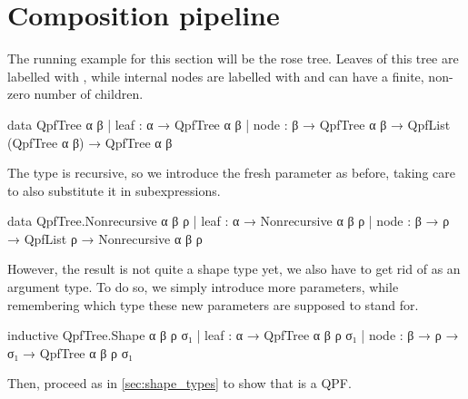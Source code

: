 \section{Composition pipeline}%
\label{sec:comp_pipeline}
The running example for this section will be the rose tree. Leaves of this tree are labelled with , while
internal nodes are labelled with  and can have a finite, non-zero number of children.
\begin{leancode}
  data QpfTree α β
    | leaf : α → QpfTree α β
    | node : β → QpfTree α β → QpfList (QpfTree α β) → QpfTree α β
\end{leancode}

The type is recursive, so we introduce the fresh parameter as before, taking care to also substitute it in 
subexpressions.
\begin{leancode}
  data QpfTree.Nonrecursive α β ρ
    | leaf : α → Nonrecursive α β ρ
    | node : β → ρ → QpfList ρ → Nonrecursive α β ρ
\end{leancode}

However, the result is not quite a shape type yet, we also have to get rid of  as an
argument type. To do so, we simply introduce more parameters, while remembering which type these
new parameters are supposed to stand for.

\begin{leancode}
  inductive QpfTree.Shape α β ρ σ₁
    | leaf : α → QpfTree α β ρ σ₁
    | node : β → ρ → σ₁ → QpfTree α β ρ σ₁
\end{leancode}

Then, proceed as in \cref{sec:shape_types} to show that  is a QPF.\@

